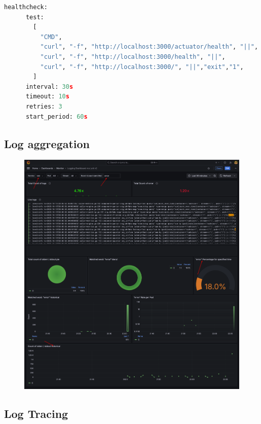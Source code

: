 \begin{lstlisting}[language=Python, caption={Health check API}, label=list:healt_API]
    healthcheck:
      test:
        [
          "CMD", 
          "curl", "-f", "http://localhost:3000/actuator/health", "||", 
          "curl", "-f", "http://localhost:3000/health", "||", 
          "curl", "-f", "http://localhost:3000/", "||","exit","1",
        ]
      interval: 30s
      timeout: 10s
      retries: 3
      start_period: 60s
\end{lstlisting}

\subsection{Log aggregation}

 \begin{figure}[h!]
    \centering 
    \includegraphics[scale=0.45]{report/img/dashboard-aggregate-logging.png}
    \caption{}
    \label{log_aggregation}
\end{figure}

\subsection{Log Tracing}

